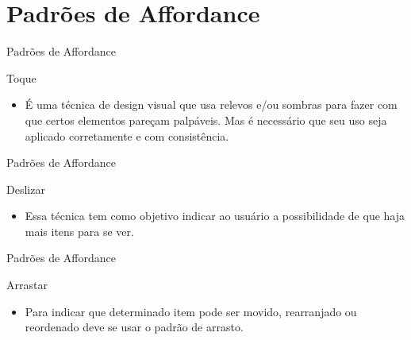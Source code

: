 \section{Padrões de Affordance}

\begin{frame}{Padrões de Affordance}
\begin{block}{Toque}
  \begin{itemize}
    \item<1-> É uma técnica de design visual que usa relevos e/ou sombras para fazer com que certos elementos pareçam palpáveis. Mas é necessário que seu uso seja aplicado corretamente e com consistência.
  \end{itemize}
\end{block}
\end{frame}

\begin{frame}{Padrões de Affordance}
\begin{block}{Deslizar}
  \begin{itemize}
    \item<1-> Essa técnica tem como objetivo indicar ao usuário a possibilidade de que haja mais itens para se ver.
  \end{itemize}
\end{block}
\end{frame}

\begin{frame}{Padrões de Affordance}
\begin{block}{Arrastar}
  \begin{itemize}
    \item<1-> Para indicar que determinado item pode ser movido, rearranjado ou reordenado deve se usar o padrão de arrasto.
  \end{itemize}
\end{block}
\end{frame}
